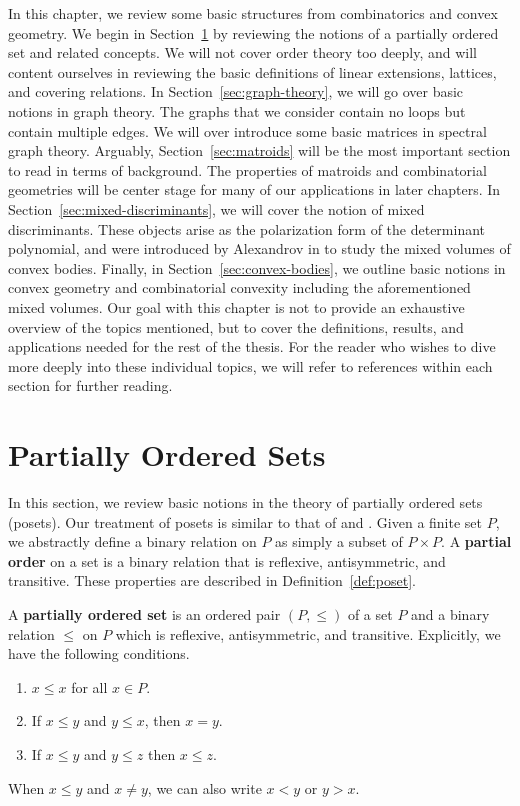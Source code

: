 \documentclass{puthesis-UG}
\begin{document}
In this chapter, we review some basic structures from combinatorics and convex geometry. We begin in Section~\ref{sec:posets} by reviewing the notions of a partially ordered set and related concepts. We will not cover order theory too deeply, and will content ourselves in reviewing the basic definitions of linear extensions, lattices, and covering relations. In Section~\ref{sec:graph-theory}, we will go over basic notions in graph theory. The graphs that we consider contain no loops but contain multiple edges. We will over introduce some basic matrices in spectral graph theory. Arguably, Section~\ref{sec:matroids} will be the most important section to read in terms of background. The properties of matroids and combinatorial geometries will be center stage for many of our applications in later chapters. In Section~\ref{sec:mixed-discriminants}, we will cover the notion of mixed discriminants. These objects arise as the polarization form of the determinant polynomial, and were introduced by Alexandrov in \cite{aleksandrov} to study the mixed volumes of convex bodies. Finally, in Section~\ref{sec:convex-bodies}, we outline basic notions in convex geometry and combinatorial convexity including the aforementioned mixed volumes. Our goal with this chapter is not to provide an exhaustive overview of the topics mentioned, but to cover the definitions, results, and applications needed for the rest of the thesis. For the reader who wishes to dive more deeply into these individual topics, we will refer to references within each section for further reading. 

\section{Partially Ordered Sets} \label{sec:posets}

In this section, we review basic notions in the theory of partially ordered sets (posets). Our treatment of posets is similar to that of \cite{ordered-sets} and \cite{Rota1964}. Given a finite set $P$, we abstractly define a binary relation on $P$ as simply a subset of $P \times P$. A \textbf{partial order} on a set is a binary relation that is reflexive, antisymmetric, and transitive. These properties are described in Definition~\ref{def:poset}. 

\begin{defn}\label{def:poset}
	A \textbf{partially ordered set} is an ordered pair $(P, \leq)$ of a set $P$ and a binary relation $\leq$ on $P$ which is reflexive, antisymmetric, and transitive. Explicitly, we have the following conditions. 
	\begin{enumerate}[label = (\alph*)]
		\item $x \leq x$ for all $x \in P$.
		\item If $x \leq y$ and $y \leq x$, then $x = y$.
		\item If $x \leq y$ and $y \leq z$ then $x \leq z$.
	\end{enumerate}
	When $x \leq y$ and $x \neq y$, we can also write $x < y$ or $y > x$.
\end{defn}
\end{document}
